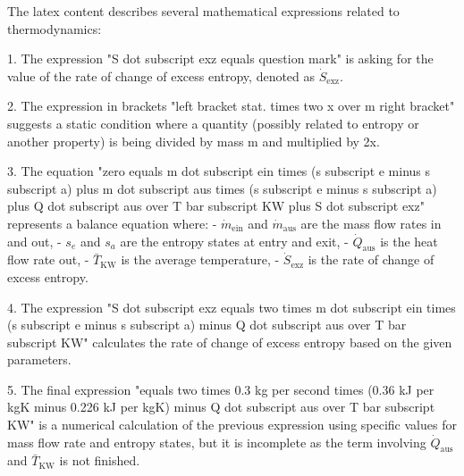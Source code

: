 The latex content describes several mathematical expressions related to thermodynamics:

1. The expression "S dot subscript exz equals question mark" is asking for the value of the rate of change of excess entropy, denoted as \( \dot{S}_{\text{exz}} \).

2. The expression in brackets "left bracket stat. times two x over m right bracket" suggests a static condition where a quantity (possibly related to entropy or another property) is being divided by mass m and multiplied by 2x.

3. The equation "zero equals m dot subscript ein times (s subscript e minus s subscript a) plus m dot subscript aus times (s subscript e minus s subscript a) plus Q dot subscript aus over T bar subscript KW plus S dot subscript exz" represents a balance equation where:
   - \( \dot{m}_{\text{ein}} \) and \( \dot{m}_{\text{aus}} \) are the mass flow rates in and out,
   - \( s_e \) and \( s_a \) are the entropy states at entry and exit,
   - \( \dot{Q}_{\text{aus}} \) is the heat flow rate out,
   - \( \bar{T}_{\text{KW}} \) is the average temperature,
   - \( \dot{S}_{\text{exz}} \) is the rate of change of excess entropy.

4. The expression "S dot subscript exz equals two times m dot subscript ein times (s subscript e minus s subscript a) minus Q dot subscript aus over T bar subscript KW" calculates the rate of change of excess entropy based on the given parameters.

5. The final expression "equals two times 0.3 kg per second times (0.36 kJ per kgK minus 0.226 kJ per kgK) minus Q dot subscript aus over T bar subscript KW" is a numerical calculation of the previous expression using specific values for mass flow rate and entropy states, but it is incomplete as the term involving \( \dot{Q}_{\text{aus}} \) and \( \bar{T}_{\text{KW}} \) is not finished.